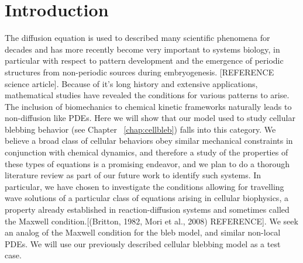 \section{Introduction}

The diffusion equation is used to described many scientific phenomena for decades and has more recently become very important to systems biology, in particular with respect to pattern development and the emergence of periodic structures from non-periodic sources during embryogenesis. [REFERENCE science article]. Because of it's long history and extensive applications, mathematical studies have revealed the conditions for various patterns to arise. The inclusion of biomechanics to chemical kinetic frameworks naturally leads to non-diffusion like PDEs. Here we will show that our model used to study cellular blebbing behavior (see Chapter ~\ref{chap:cellbleb}) falls into this category. We believe a broad class of cellular behaviors obey similar mechanical constraints in conjunction with chemical dynamics, and therefore a study of the properties of these types of equations is a promising endeavor, and we plan to do a thorough literature review as part of our future work to identify such systems. In particular, we have chosen to investigate the conditions allowing for travelling wave solutions of a particular class of equations arising in cellular biophysics, a property already established in reaction-diffusion systems and sometimes called the Maxwell condition.[(Britton, 1982, Mori et al., 2008) REFERENCE]. We seek an analog of the Maxwell condition for the bleb model, and similar non-local PDEs. We will use our previously described cellular blebbing model as a test case.\\







